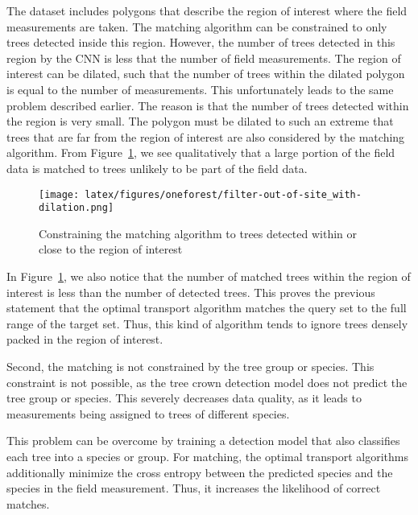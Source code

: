 \documentclass[10pt,twocolumn,letterpaper]{article}
\begin{document}
The dataset includes polygons that describe the region of interest where the field measurements are taken.
The matching algorithm can be constrained to only trees detected inside this region.
However, the number of trees detected in this region by the CNN is less that the number of field measurements.
The region of interest can be dilated, such that the number of trees within the dilated polygon is equal to the number of measurements.
This unfortunately leads to the same problem described earlier.
The reason is that the number of trees detected within the region is very small.
The polygon must be dilated to such an extreme that trees that are far from the region of interest are also considered by the matching algorithm.
From Figure~\ref{oneforest-with-out-of-site}, we see qualitatively that a large portion of the field data is matched to trees unlikely to be part of the field data.

\begin{figure}
\centering
\texttt{[image: latex/figures/oneforest/filter-out-of-site\_with-dilation.png]}  
\caption{Constraining the matching algorithm to trees detected within or close to the region of interest}
\label{oneforest-with-out-of-site}
\end{figure}

In Figure~\ref{oneforest-with-out-of-site}, we also notice that the number of matched trees within the region of interest is less than the number of detected trees.
This proves the previous statement that the optimal transport algorithm matches the query set to the full range of the target set.
Thus, this kind of algorithm tends to ignore trees densely packed in the region of interest.

Second, the matching is not constrained by the tree group or species.
This constraint is not possible, as the tree crown detection model does not predict the tree group or species.
This severely decreases data quality, as it leads to measurements being assigned to trees of different species.

This problem can be overcome by training a detection model that also classifies each tree into a species or group.
For matching, the optimal transport algorithms additionally minimize the cross entropy between the predicted species and the species in the field measurement.
Thus, it increases the likelihood of correct matches.
\end{document}
